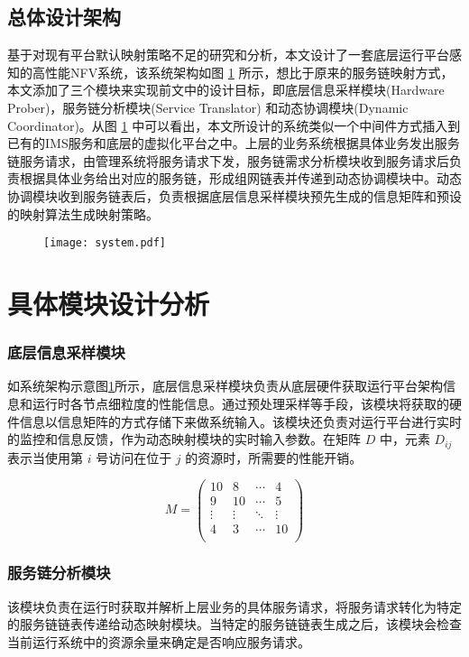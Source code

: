\subsection{总体设计架构}
基于对现有平台默认映射策略不足的研究和分析，本文设计了一套底层运行平台感知的高性能NFV系统，该系统架构如图 \ref{fig:system} 所示，想比于原来的服务链映射方式，本文添加了三个模块来实现前文中的设计目标，即底层信息采样模块(Hardware Prober)，服务链分析模块(Service Translator) 和动态协调模块(Dynamic Coordinator)。从图 \ref{fig:system} 中可以看出，本文所设计的系统类似一个中间件方式插入到已有的IMS服务和底层的虚拟化平台之中。上层的业务系统根据具体业务发出服务链服务请求，由管理系统将服务请求下发，服务链需求分析模块收到服务请求后负责根据具体业务给出对应的服务链，形成组网链表并传递到动态协调模块中。动态协调模块收到服务链表后，负责根据底层信息采样模块预先生成的信息矩阵和预设的映射算法生成映射策略。
\begin{figure}[!htp]
	\label{fig:system}
	\centering
	\texttt{[image: system.pdf]}
\end{figure}

\section{具体模块设计分析}
\subsubsection{底层信息采样模块}
如系统架构示意图\ref{fig:system}所示，底层信息采样模块负责从底层硬件获取运行平台架构信息和运行时各节点细粒度的性能信息。通过预处理采样等手段，该模块将获取的硬件信息以信息矩阵的方式存储下来做系统输入。该模块还负责对运行平台进行实时的监控和信息反馈，作为动态映射模块的实时输入参数。在矩阵 $D$ 中，元素 $D_{ij}$ 表示当使用第 $i$ 号访问在位于 $j$ 的资源时，所需要的性能开销。

$$
M =
\begin{pmatrix}
10      & 8      & \cdots & 4      \\
9      & 10      & \cdots & 5      \\
\vdots & \vdots & \ddots & \vdots \\
4      & 3      & \cdots & 10     \\
\end{pmatrix}
$$



\subsubsection{服务链分析模块}
该模块负责在运行时获取并解析上层业务的具体服务请求，将服务请求转化为特定的服务链链表传递给动态映射模块。当特定的服务链链表生成之后，该模块会检查当前运行系统中的资源余量来确定是否响应服务请求。


